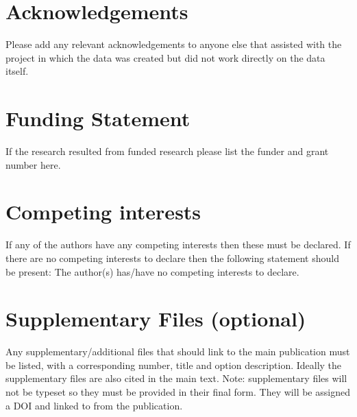 \documentclass{article}
\begin{document}
\section*{Acknowledgements}
Please add any relevant acknowledgements to anyone else that assisted with the project in which the data was created but did not work directly on the data itself.

\section*{Funding Statement}
If the research resulted from funded research please list the funder and grant number here.

\section*{Competing interests} 
If any of the authors have any competing interests then these must be declared. If there are no competing interests to declare then the following statement should be present: The author(s) has/have no competing interests to declare.





\section*{Supplementary Files (optional)}
Any supplementary/additional files that should link to the main publication must be listed, with a corresponding number, title and option description. Ideally the supplementary files are also cited in the main text.
Note: supplementary files will not be typeset so they must be provided in their final form. They will be assigned a DOI and linked to from the publication.
\end{document}
